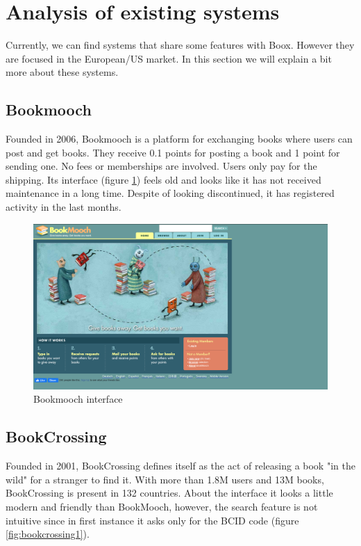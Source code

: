 \documentclass{article}
\begin{document}
\section{Analysis of existing systems}
Currently, we can find systems that share some features with Boox. However they are focused in the European/US market. In this section we will explain a bit more about these systems.

\subsection{Bookmooch}

Founded in 2006, Bookmooch is a platform for exchanging books where users can post and get books. They receive 0.1 points for posting a book and 1 point for sending one. No fees or memberships are involved. Users only pay for the shipping. Its interface (figure \ref{fig:bookmooch}) feels old and looks like it has not received maintenance in a long time. Despite of looking discontinued, it has registered activity in the last months. 

\begin{figure}[h]
    \centering
    \includegraphics[scale=0.2]{img/bookmooch.png}
    \caption{Bookmooch interface}
    \label{fig:bookmooch}
\end{figure}

\subsection{BookCrossing}
Founded in 2001, BookCrossing defines itself as the act of releasing a book "in the wild" for a stranger to find it. With more than 1.8M users and 13M books, BookCrossing is present in 132 countries. About the interface it looks a little modern and friendly than BookMooch, however, the search feature is not intuitive since in first instance it asks only for the BCID code (figure \ref{fig:bookcrossing1}).
\end{document}
